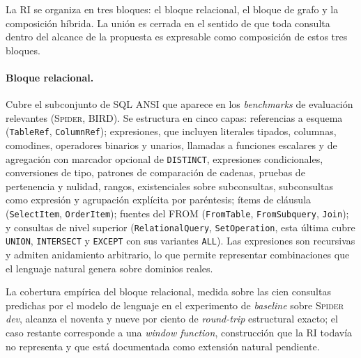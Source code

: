 La \ac{RI} se organiza en tres bloques: el bloque relacional, el bloque de grafo y la composición híbrida. La unión es cerrada en el sentido de que toda consulta dentro del alcance de la propuesta es expresable como composición de estos tres bloques.

\paragraph{Bloque relacional.} Cubre el subconjunto de \ac{SQL} ANSI que aparece en los \emph{benchmarks} de evaluación relevantes (\textsc{Spider}, \textsc{BIRD}). Se estructura en cinco capas: referencias a esquema (\texttt{TableRef}, \texttt{ColumnRef}); expresiones, que incluyen literales tipados, columnas, comodines, operadores binarios y unarios, llamadas a funciones escalares y de agregación con marcador opcional de \texttt{DISTINCT}, expresiones condicionales, conversiones de tipo, patrones de comparación de cadenas, pruebas de pertenencia y nulidad, rangos, existenciales sobre subconsultas, subconsultas como expresión y agrupación explícita por paréntesis; ítems de cláusula (\texttt{SelectItem}, \texttt{OrderItem}); fuentes del FROM (\texttt{FromTable}, \texttt{FromSubquery}, \texttt{Join}); y consultas de nivel superior (\texttt{RelationalQuery}, \texttt{SetOperation}, esta última cubre \texttt{UNION}, \texttt{INTERSECT} y \texttt{EXCEPT} con sus variantes \texttt{ALL}). Las expresiones son recursivas y admiten anidamiento arbitrario, lo que permite representar combinaciones que el lenguaje natural genera sobre dominios reales.

La cobertura empírica del bloque relacional, medida sobre las cien consultas predichas por el modelo de lenguaje en el experimento de \emph{baseline} sobre \textsc{Spider} \emph{dev}, alcanza el noventa y nueve por ciento de \emph{round-trip} estructural exacto; el caso restante corresponde a una \emph{window function}, construcción que la \ac{RI} todavía no representa y que está documentada como extensión natural pendiente.

